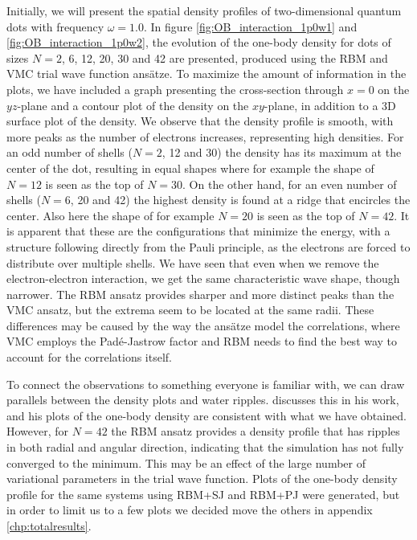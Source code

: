 Initially, we will present the spatial density profiles of two-dimensional quantum dots with frequency $\omega=1.0$. In figure \eqref{fig:OB_interaction_1p0w1} and \eqref{fig:OB_interaction_1p0w2}, the evolution of the one-body density for dots of sizes $N=2$, 6, 12, 20, 30 and 42 are presented, produced using the RBM and VMC trial wave function ansätze. To maximize the amount of information in the plots, we have included a graph presenting the cross-section through $x=0$ on the $yz$-plane and a contour plot of the density on the $xy$-plane, in addition to a 3D surface plot of the density. We observe that the density profile is smooth, with more peaks as the number of electrons increases, representing high densities. For an odd number of shells ($N=2$, 12 and 30) the density has its maximum at the center of the dot, resulting in equal shapes where for example the shape of $N=12$ is seen as the top of $N=30$. On the other hand, for an even number of shells ($N=6$, 20 and 42) the highest density is found at a ridge that encircles the center. Also here the shape of for example $N=20$ is seen as the top of $N=42$. It is apparent that these are the configurations that minimize the energy, with a structure following directly from the Pauli principle, as the electrons are forced to distribute over multiple shells. We have seen that even when we remove the electron-electron interaction, we get the same characteristic wave shape, though narrower. The RBM ansatz provides sharper and more distinct peaks than the VMC ansatz, but the extrema seem to be located at the same radii. These differences may be caused by the way the ansätze model the correlations, where VMC employs the Padé-Jastrow factor and RBM needs to find the best way to account for the correlations itself. 

To connect the observations to something everyone is familiar with, we can draw parallels between the density plots and water ripples. \citet{hogberget_quantum_2013} discusses this in his work, and his plots of the one-body density are consistent with what we have obtained. However, for $N=42$ the RBM ansatz provides a density profile that has ripples in both radial and angular direction, indicating that the simulation has not fully converged to the minimum. This may be an effect of the large number of variational parameters in the trial wave function. Plots of the one-body density profile for the same systems using RBM+SJ and RBM+PJ were generated, but in order to limit us to a few plots we decided move the others in appendix \ref{chp:totalresults}.

